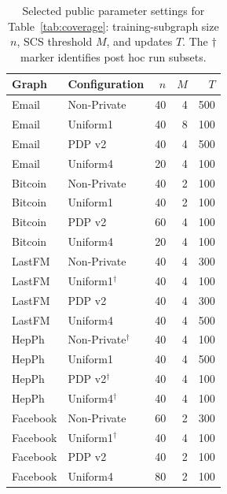 \begin{table}[htbp]
\centering\small
\caption{Selected public parameter settings for Table~\ref{tab:coverage}: training-subgraph size $n$, SCS threshold $M$, and updates $T$. The $\dagger$ marker identifies post hoc run subsets.}\label{tab:frozenparams}
\begin{tabular}{llrrr}
\toprule
Graph & Configuration & $n$ & $M$ & $T$\\ \midrule
Email & Non-Private & 40 & 4 & 500 \\
Email & Uniform1 & 40 & 8 & 100 \\
Email & PDP v2 & 40 & 4 & 500 \\
Email & Uniform4 & 20 & 4 & 100 \\
Bitcoin & Non-Private & 40 & 2 & 100 \\
Bitcoin & Uniform1 & 40 & 2 & 100 \\
Bitcoin & PDP v2 & 60 & 4 & 100 \\
Bitcoin & Uniform4 & 20 & 4 & 100 \\
LastFM & Non-Private & 40 & 4 & 300 \\
LastFM & Uniform1$^{\dagger}$ & 40 & 4 & 100 \\
LastFM & PDP v2 & 40 & 4 & 300 \\
LastFM & Uniform4 & 40 & 4 & 500 \\
HepPh & Non-Private$^{\dagger}$ & 40 & 4 & 100 \\
HepPh & Uniform1 & 40 & 4 & 500 \\
HepPh & PDP v2$^{\dagger}$ & 40 & 4 & 100 \\
HepPh & Uniform4$^{\dagger}$ & 40 & 4 & 100 \\
Facebook & Non-Private & 60 & 2 & 300 \\
Facebook & Uniform1$^{\dagger}$ & 40 & 4 & 100 \\
Facebook & PDP v2 & 40 & 2 & 100 \\
Facebook & Uniform4 & 80 & 2 & 100 \\
\bottomrule\end{tabular}
\end{table}

